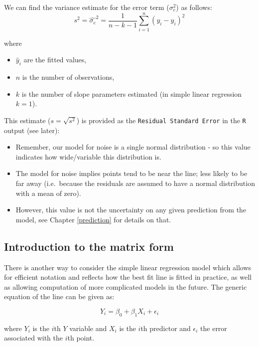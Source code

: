 \documentclass[
  oneside]{krantz}
\providecommand{\tightlist}{%
  \setlength{\itemsep}{0pt}\setlength{\parskip}{0pt}}
\begin{document}
We can find the variance estimate for the error term (\(\sigma_e^2\)) as follows:
\begin{equation}
s^2 = \hat{\sigma_e}^2=\frac{1}{n-k-1}\sum_{i=1}^n(y_i-\hat{y}_i)^2
\end{equation}

where

\begin{itemize}
\tightlist
\item
  \(\hat{y}_i\) are the fitted values,
\item
  \(n\) is the number of observations,
\item
  \(k\) is the number of slope parameters estimated (in simple linear regression \(k=1\)).
\end{itemize}

This estimate (\(s=\sqrt{s^2}\)) is provided as the \texttt{Residual\ Standard\ Error} in the \texttt{R} output (see later):

\begin{itemize}
\tightlist
\item
  Remember, our model for noise is a single normal distribution - so this value indicates how wide/variable this distribution is.
\item
  The model for noise implies points tend to be near the line; less likely to be far away (i.e.~because the residuals are assumed to have a normal distribution with a mean of zero).
\item
  However, this value is not the uncertainty on any given prediction from the model, see Chapter \ref{prediction} for details on that.
\end{itemize}

\hypertarget{introduction-to-the-matrix-form}{%
\subsection{Introduction to the matrix form}\label{introduction-to-the-matrix-form}}

There is another way to consider the simple linear regression model which allows for efficient notation and reflects how the best fit line is fitted in practice, as well as allowing computation of more complicated models in the future. The generic equation of the line can be given as:

\[ Y_i = \beta_0+\beta_1 X_i + \epsilon_i \]

where \(Y_i\) is the \(i\)th \(Y\) variable and \(X_i\) is the \(i\)th predictor and \(\epsilon_i\) the error associated with the \(i\)th point.
\end{document}
